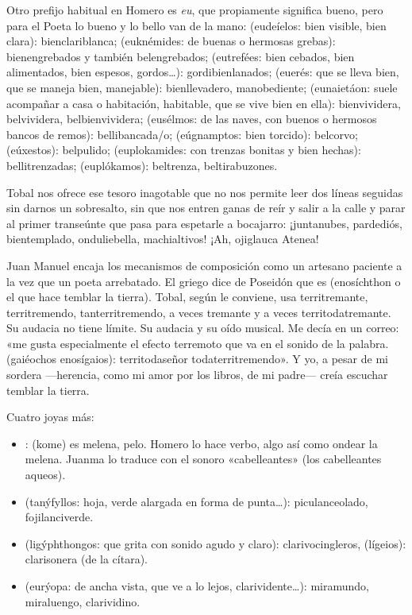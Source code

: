 Otro prefijo habitual en Homero es \emph{eu}, que propiamente significa bueno, pero para el Poeta lo bueno y lo bello van de la mano:  (eudeíelos: bien visible, bien clara): bienclariblanca;  (euknémides: de buenas o hermosas grebas): bienengrebados y también belengrebados;  (eutrefées: bien cebados, bien alimentados, bien espesos, gordos…): gordibienlanados;  (euerés: que se lleva bien, que se maneja bien, manejable): bienllevadero, manobediente;  (eunaietáon: suele acompañar a casa o habitación, habitable, que se vive bien en ella): bienvividera, belvividera, belbienvividera;  (eusélmos: de las naves, con buenos o hermosos bancos de remos): bellibancada/o;  (eúgnamptos: bien torcido): belcorvo;  (eúxestos): belpulido;  (euplokamides: con trenzas bonitas y bien hechas): bellitrenzadas;  (euplókamos): beltrenza, beltirabuzones.

Tobal nos ofrece ese tesoro inagotable que no nos permite leer dos líneas seguidas sin darnos un sobresalto, sin que nos entren ganas de reír y salir a la calle y parar al primer transeúnte que pasa para espetarle a bocajarro: ¡juntanubes, pardediós, bientemplado, onduliebella, machialtivos! ¡Ah, ojiglauca Atenea!

Juan Manuel encaja los mecanismos de composición como un artesano paciente a la vez que un poeta arrebatado. El griego dice de Poseidón que es  (enosíchthon o el que hace temblar la tierra). Tobal, según le conviene, usa territremante, territremendo, tanterritremendo, a veces tremante y a veces territodatremante. Su audacia no tiene límite. Su audacia y su oído musical. Me decía en un correo: «me gusta especialmente el efecto terremoto que va en el sonido de la palabra.  (gaiéochos enosígaios): territodaseñor todaterritremendo». Y yo, a pesar de mi sordera ---herencia, como mi amor por los libros, de mi padre--- creía escuchar temblar la tierra.

Cuatro joyas más:

\begin{itemize}
\item {}:  (kome) es melena, pelo. Homero lo hace verbo, algo así como ondear la melena. Juanma lo traduce con el sonoro «cabelleantes» (los cabelleantes aqueos).

\item {} (tanýfyllos: hoja, verde alargada en forma de punta…): piculanceolado, fojilanciverde.

\item {} (ligýphthongos: que grita con sonido agudo y claro): clarivocingleros,  (lígeios): clarisonera (de la cítara).

\item {} (eurýopa: de ancha vista, que ve a lo lejos, clarividente…): miramundo, miraluengo, clarividino.

\end{itemize}


